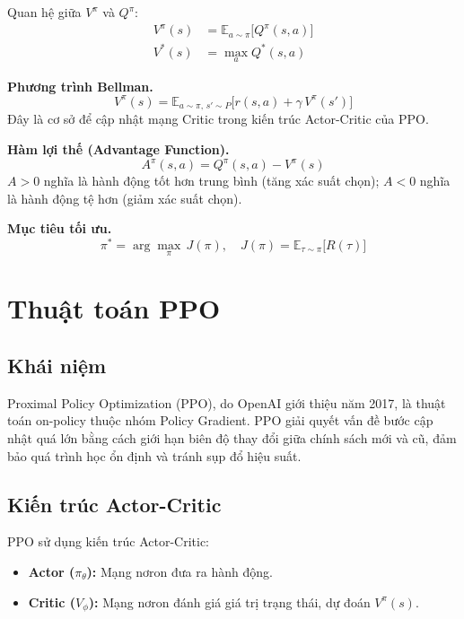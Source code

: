 Quan hệ giữa $V^\pi$ và $Q^\pi$:
\begin{align}
    V^\pi(s) &= \mathbb{E}_{a\sim\pi}\bigl[Q^\pi(s,a)\bigr] \\
    V^*(s)   &= \max_a Q^*(s,a)
\end{align}

\textbf{Phương trình Bellman.}
\begin{equation}
    V^\pi(s) = \mathbb{E}_{a\sim\pi,\, s'\sim P}
    \bigl[r(s,a) + \gamma\, V^\pi(s')\bigr]
    \label{eq:bellman}
\end{equation}
Đây là cơ sở để cập nhật mạng Critic trong kiến trúc Actor-Critic của PPO.

\textbf{Hàm lợi thế (Advantage Function).}
\begin{equation}
    A^\pi(s,a) = Q^\pi(s,a) - V^\pi(s)
    \label{eq:advantage}
\end{equation}
$A > 0$ nghĩa là hành động tốt hơn trung bình (tăng xác suất chọn);
$A < 0$ nghĩa là hành động tệ hơn (giảm xác suất chọn).

\textbf{Mục tiêu tối ưu.}
\begin{equation}
    \pi^* = \arg\max_\pi\, J(\pi),
    \quad J(\pi) = \mathbb{E}_{\tau \sim \pi}\bigl[R(\tau)\bigr]
    \label{eq:rl_objective}
\end{equation}


\section{Thuật toán PPO}

\subsection{Khái niệm}

Proximal Policy Optimization (PPO), do OpenAI giới thiệu năm 2017, là thuật
toán on-policy thuộc nhóm Policy Gradient. PPO giải quyết vấn đề bước cập nhật
quá lớn bằng cách giới hạn biên độ thay đổi giữa chính sách mới và cũ, đảm bảo
quá trình học ổn định và tránh sụp đổ hiệu suất.

\subsection{Kiến trúc Actor-Critic}

PPO sử dụng kiến trúc Actor-Critic:
\begin{itemize}
    \item \textbf{Actor ($\pi_\theta$):} Mạng nơron đưa ra hành động.
    \item \textbf{Critic ($V_\phi$):} Mạng nơron đánh giá giá trị trạng thái,
    dự đoán $V^\pi(s)$.
\end{itemize}

